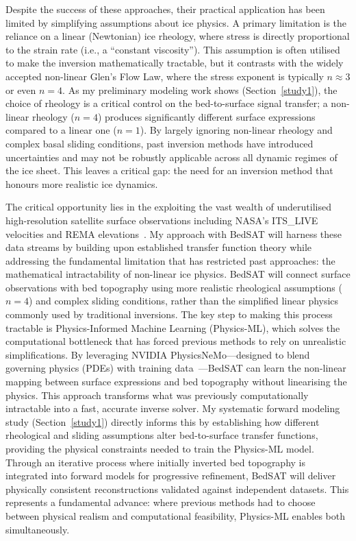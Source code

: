 Despite the success of these approaches, their practical application has been limited by simplifying assumptions about ice physics. A primary limitation is the reliance on a linear (Newtonian) ice rheology, where stress is directly proportional to the strain rate (i.e., a ``constant viscosity''). This assumption is often utilised to make the inversion mathematically tractable, but it contrasts with the widely accepted non-linear Glen's Flow Law, where the stress exponent is typically 
$n \approx 3$ or even $n = 4$. As my preliminary modeling work shows (Section~\ref{study1}), the choice of rheology is a critical control on the bed-to-surface signal transfer; a non-linear rheology ($n = 4$) produces significantly different surface expressions compared to a linear one ($n = 1$). By largely ignoring non-linear rheology and complex basal sliding conditions, past inversion methods have introduced uncertainties and may not be robustly applicable across all dynamic regimes of the ice sheet. This leaves a critical gap: the need for an inversion method that honours more realistic ice dynamics.

The critical opportunity lies in the exploiting the vast wealth of underutilised high-resolution satellite surface observations including NASA's ITS\_LIVE~\cite{itslive} velocities and REMA elevations~\cite{REMA}. My approach with BedSAT will harness these data streams by building upon established transfer function theory while addressing the fundamental limitation that has restricted past approaches: the mathematical intractability of non-linear ice physics. BedSAT will connect surface observations with bed topography using more realistic rheological assumptions ($n = 4$) and complex sliding conditions, rather than the simplified linear physics commonly used by traditional inversions. The key step to making this process tractable is Physics-Informed Machine Learning (Physics-ML), which solves the computational bottleneck that has forced previous methods to rely on unrealistic simplifications. By leveraging NVIDIA PhysicsNeMo—designed to blend governing physics (PDEs) with training data~\cite{NVIDIA_NeMo_2025}—BedSAT can learn the non-linear mapping between surface expressions and bed topography without linearising the physics. This approach transforms what was previously computationally intractable into a fast, accurate inverse solver. My systematic forward modeling study (Section~\ref{study1}) directly informs this by establishing how different rheological and sliding assumptions alter bed-to-surface transfer functions, providing the physical constraints needed to train the Physics-ML model.
Through an iterative process where initially inverted bed topography is integrated into forward models for progressive refinement, BedSAT will deliver physically consistent reconstructions validated against independent datasets. This represents a fundamental advance: where previous methods had to choose between physical realism and computational feasibility, Physics-ML enables both simultaneously.

